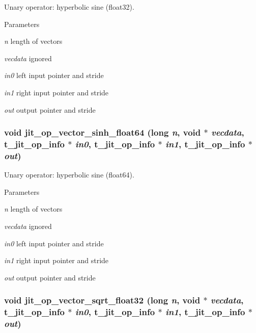 Unary operator: hyperbolic sine (float32). 
\begin{DoxyParams}{Parameters}
\item[{\em n}]length of vectors \item[{\em vecdata}]ignored \item[{\em in0}]left input pointer and stride \item[{\em in1}]right input pointer and stride \item[{\em out}]output pointer and stride \end{DoxyParams}
\hypertarget{group__opvecmod_ga7e20091f22eff18d921e3bba2ac20ece}{
\subsubsection[{jit\_\-op\_\-vector\_\-sinh\_\-float64}]{\setlength{\rightskip}{0pt plus 5cm}void jit\_\-op\_\-vector\_\-sinh\_\-float64 (long {\em n}, \/  void $\ast$ {\em vecdata}, \/  {\bf t\_\-jit\_\-op\_\-info} $\ast$ {\em in0}, \/  {\bf t\_\-jit\_\-op\_\-info} $\ast$ {\em in1}, \/  {\bf t\_\-jit\_\-op\_\-info} $\ast$ {\em out})}}
\label{group__opvecmod_ga7e20091f22eff18d921e3bba2ac20ece}


Unary operator: hyperbolic sine (float64). 
\begin{DoxyParams}{Parameters}
\item[{\em n}]length of vectors \item[{\em vecdata}]ignored \item[{\em in0}]left input pointer and stride \item[{\em in1}]right input pointer and stride \item[{\em out}]output pointer and stride \end{DoxyParams}
\hypertarget{group__opvecmod_gaafc329ba4b3589f415349f592b435465}{
\subsubsection[{jit\_\-op\_\-vector\_\-sqrt\_\-float32}]{\setlength{\rightskip}{0pt plus 5cm}void jit\_\-op\_\-vector\_\-sqrt\_\-float32 (long {\em n}, \/  void $\ast$ {\em vecdata}, \/  {\bf t\_\-jit\_\-op\_\-info} $\ast$ {\em in0}, \/  {\bf t\_\-jit\_\-op\_\-info} $\ast$ {\em in1}, \/  {\bf t\_\-jit\_\-op\_\-info} $\ast$ {\em out})}}
\label{group__opvecmod_gaafc329ba4b3589f415349f592b435465}


